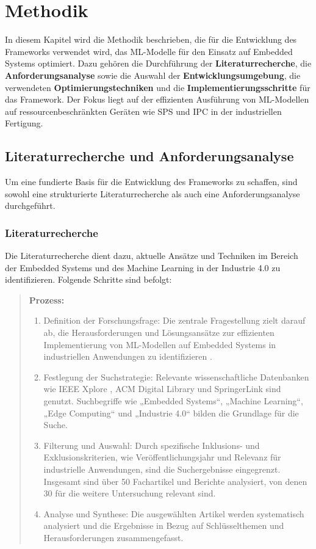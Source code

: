\chapter{Methodik}
\label{chap:methodik}

In diesem Kapitel wird die Methodik beschrieben, die für die Entwicklung des Frameworks verwendet wird, das ML-Modelle für den Einsatz auf Embedded Systems optimiert. 
Dazu gehören die Durchführung der \textbf{Literaturrecherche}, die \textbf{Anforderungsanalyse} \cite{10433185} sowie die Auswahl der \textbf{Entwicklungsumgebung}, die verwendeten 
\textbf{Optimierungstechniken} \cite{9838829} und die \textbf{Implementierungsschritte} für das Framework. Der Fokus liegt auf der effizienten Ausführung von ML-Modellen auf 
ressourcenbeschränkten Geräten wie SPS und IPC in der industriellen Fertigung.

\section{Literaturrecherche und Anforderungsanalyse}

Um eine fundierte Basis für die Entwicklung des Frameworks zu schaffen, sind sowohl eine strukturierte Literaturrecherche als auch eine Anforderungsanalyse durchgeführt.
\subsection{Literaturrecherche}

Die Literaturrecherche dient dazu, aktuelle Ansätze und Techniken im Bereich der Embedded Systems und des Machine Learning in der Industrie 4.0 zu identifizieren. 
Folgende Schritte sind befolgt:
\begin{quote}
\textbf{Prozess:}
\begin{enumerate}
\item Definition der Forschungsfrage: Die zentrale Fragestellung zielt darauf ab, die Herausforderungen und Lösungsansätze zur effizienten Implementierung von ML-Modellen auf Embedded Systems in industriellen Anwendungen zu identifizieren \cite{9427249}.
\item Festlegung der Suchstrategie: Relevante wissenschaftliche Datenbanken wie IEEE Xplore \cite{9427249}, ACM Digital Library \cite{ACMDigitalLibrary} und SpringerLink \cite{SpringerLink}sind genutzt. Suchbegriffe wie „Embedded Systems“, „Machine Learning“, „Edge Computing“ und „Industrie 4.0“ bilden die Grundlage für die Suche.
\item Filterung und Auswahl: Durch spezifische Inklusions- und Exklusionskriterien, wie Veröffentlichungsjahr und Relevanz für industrielle Anwendungen, sind die Suchergebnisse eingegrenzt. Insgesamt sind über 50 Fachartikel und Berichte analysiert, von denen 30 für die weitere Untersuchung relevant sind.
\item Analyse und Synthese: Die ausgewählten Artikel werden systematisch analysiert und die Ergebnisse in Bezug auf Schlüsselthemen und Herausforderungen zusammengefasst.
\end{enumerate}
\end{quote}
